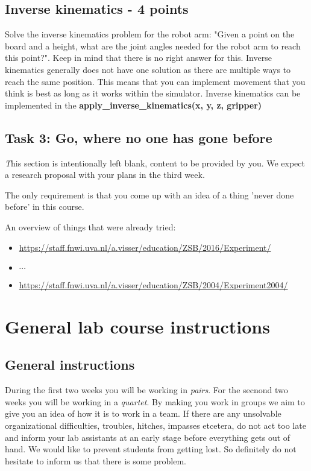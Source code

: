 \documentclass[10pt]{scrartcl}
\begin{document}
\subsection*{Inverse kinematics - 4 points}
Solve the inverse kinematics problem for the robot arm: "Given a point on the board and a height, what are the joint angles needed for the robot arm to reach this point?". Keep in mind that there is no right answer for this. Inverse kinematics generally does not have one solution as there are multiple ways to reach the same position. This means that you can implement movement that you think is best as long as it works within the simulator. Inverse kinematics can be implemented in the \textbf{apply\_inverse\_kinematics(x, y, z, gripper)}


\subsection{Task 3: Go, where no one has gone before}
\label{sec:Experiment}

{\textit This section is intentionally left blank, content to be provided by you. 
We expect a research proposal with your plans in the third week.}

The only requirement is that you come up with an idea of a thing 'never done before' in this course.

An overview of things that were already tried:
\begin{itemize}
\item \url{https://staff.fnwi.uva.nl/a.visser/education/ZSB/2016/Experiment/}
\item $\cdots$
\item \url{https://staff.fnwi.uva.nl/a.visser/education/ZSB/2004/Experiment2004/}
\end{itemize}

\section{General lab course instructions}
\label{sec:Report}
\subsection{General instructions}
During the first two weeks you will be working in {\em pairs}.
For the secnond two weeks you will be working in a {\em quartet}.
By making you work in groups we aim to give you an idea of how it
is to work in a team. If there are any unsolvable organizational
difficulties, troubles, hitches, impasses etcetera, do not act too late
and inform your lab assistants at an early stage before everything gets
out of hand. We would like to prevent students from getting lost. So
definitely do not hesitate to inform us that there is some problem.
\end{document}
